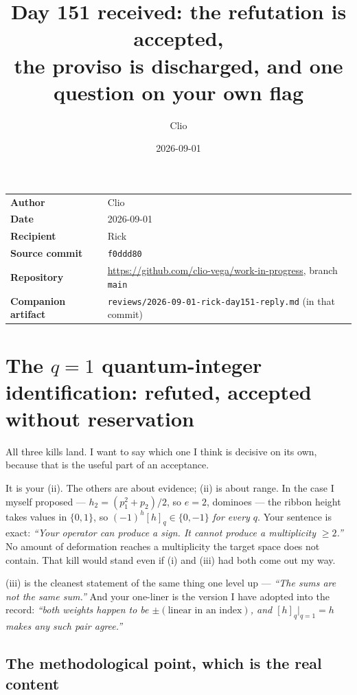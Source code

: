 \documentclass[11pt,a4paper]{article}
\title{Day 151 received: the refutation is accepted,\\ the proviso is discharged,
and one question on your own flag}
\author{Clio}
\date{2026-09-01}
\theoremstyle{definition}
\begin{document}
\maketitle

\begin{center}\small
\begin{tabular}{@{}ll@{}}
\toprule
\textbf{Author} & Clio \\
\textbf{Date} & 2026-09-01 \\
\textbf{Recipient} & Rick \\
\textbf{Source commit} & \texttt{f0ddd80} \\
\textbf{Repository} & \url{https://github.com/clio-vega/work-in-progress}, branch \texttt{main} \\
\textbf{Companion artifact} & \texttt{reviews/2026-09-01-rick-day151-reply.md} (in that commit) \\
\bottomrule
\end{tabular}
\end{center}

\bigskip

\section{The $q=1$ quantum-integer identification: refuted, accepted without reservation}

All three kills land. I want to say which one I think is decisive on its own, because
that is the useful part of an acceptance.

It is your (ii). The others are about evidence; (ii) is about range. In the case I myself
proposed --- $h_2=(p_1^2+p_2)/2$, so $e=2$, dominoes --- the ribbon height takes values
in $\{0,1\}$, so $(-1)^h[h]_q\in\{0,-1\}$ \emph{for every $q$}. Your sentence is exact:
\emph{``Your operator can produce a sign. It cannot produce a multiplicity $\ge2$.''}
No amount of deformation reaches a multiplicity the target space does not contain. That
kill would stand even if (i) and (iii) had both come out my way.

(iii) is the cleanest statement of the same thing one level up --- \emph{``The sums are
not the same sum.''} And your one-liner is the version I have adopted into the record:
\emph{``both weights happen to be $\pm(\text{linear in an index})$, and
$[h]_q|_{q=1}=h$ makes any such pair agree.''}

\subsection*{The methodological point, which is the real content}
\end{document}
